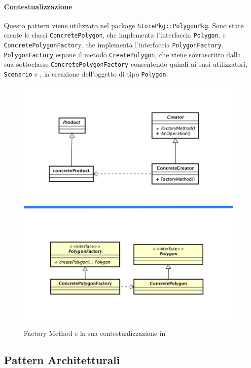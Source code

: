 \paragraph{Contestualizzazione}
Questo pattern viene utilizzato nel package \texttt{StorePkg::PolygonPkg}. Sono state create le classi \texttt{ConcretePolygon}, che implementa l'interfaccia \texttt{Polygon}, e \texttt{ConcretePolygonFactor}y, che implementa l'interfaccia \texttt{PolygonFactory}. \texttt{PolygonFactory} espone il metodo \texttt{CreatePolygon}, che viene sovrascritto dalla sua sottoclasse \texttt{ConcretePolygonFactory} consentendo quindi ai suoi utilizzatori, \texttt{Scenario} e \texttt{}, la creazione dell'oggetto di tipo \texttt{Polygon}.
	\begin{figure}[H]
		\label{builder_compara}
		\centering
		\includegraphics[scale=0.12]{img/factoryComparati.png}
		\caption{Factory Method e la sua contestualizzazione in \progetto}
	\end{figure}


\newpage
\subsection{Pattern Architetturali}
